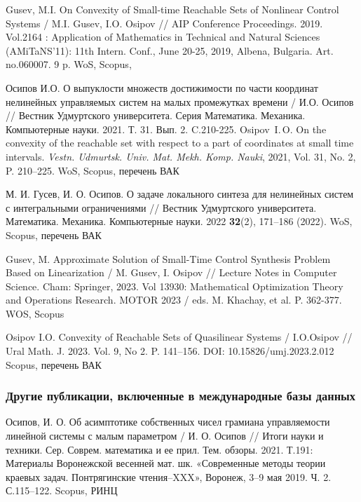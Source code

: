 \documentclass[../main.tex]{subfiles}
\begin{document}
\begin{thebibliography}{99}
Gusev, M.I. 
On Convexity of Small-time Reachable Sets of Nonlinear Control Systems / 
M.I. Gusev, I.O. Osipov // 
AIP Conference Proceedings. 
2019. 
Vol.2164 : 
Application of Mathematics in Technical and Natural Sciences (AMiTaNS’11): 
11th Intern. Conf., 
June 20-25, 2019, Albena, Bulgaria. 
Art. no.060007. 9 p.
WoS, Scopus,

Осипов И.О. 
О выпуклости множеств достижимости по части координат нелинейных управляемых систем на малых промежутках времени / 
И.О. Осипов // 
Вестник Удмуртского университета. Серия Математика. Механика. Компьютерные науки. 
2021. Т. 31. Вып. 2. C.210-225.
Osipov~I.\,O. On the convexity of the reachable set with respect to a part of coordinates at small time intervals. 
\emph{Vestn. Udmurtsk. Univ. Mat. Mekh. Komp. Nauki}, 2021,  Vol. 31, No. 2, P. 210--225.
WoS, Scopus, перечень ВАК

М. И. Гусев, И. О. Осипов.
О задаче локального синтеза для нелинейных систем с интегральными ограничениями // 
Вестник Удмуртского университета. Математика. Механика. Компьютерные науки. 2022
\textbf{32}(2), 171–186 (2022).
WoS, Scopus, перечень ВАК


Gusev, M. 
Approximate Solution of Small-Time Control Synthesis Problem Based on Linearization / 
M. Gusev, I. Osipov // 
Lecture Notes in Computer Science. Cham: Springer, 
2023. Vol 13930: 
Mathematical Optimization Theory and Operations Research. 
MOTOR 2023 / eds. M. Khachay, et al.
P. 362-377.
WOS, Scopus

Osipov I.O. 
Convexity of Reachable Sets of Quasilinear Systems /
I.O.Osipov // 
Ural Math. J. 
2023. Vol. 9, No 2. P. 141–156. 
DOI: 10.15826/umj.2023.2.012
Scopus, перечень ВАК


\subsubsection*{Другие публикации, включенные в международные базы данных}
Осипов, И. О. 
Об асимптотике собственных чисел грамиана управляемости линейной системы с малым параметром / 
И. О. Осипов // 
Итоги науки и техники. Сер. Соврем. математика и ее прил. Тем. обзоры. 
2021. Т.191: Материалы Воронежской весенней мат. шк. «Современные методы теории краевых задач. Понтрягинские чтения–XXX», 
Воронеж, 3–9 мая 2019. Ч. 2. С.115–122. 
Scopus, РИНЦ


\end{thebibliography}
\end{document}

